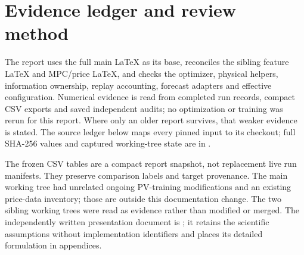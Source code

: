 \section{Evidence ledger and review method}
The report uses the full main LaTeX as its base, reconciles the sibling
feature LaTeX and MPC/price LaTeX, and checks the optimizer, physical helpers,
information ownership, replay accounting, forecast adapters and effective
configuration. Numerical evidence is read from completed run records, compact
CSV exports and saved independent audits; no optimization or training was
rerun for this report. Where only an older report survives, that weaker evidence
is stated. The source ledger below maps every pinned input to its checkout;
full SHA-256 values and captured working-tree state are in
.

The frozen CSV tables are a compact report snapshot, not replacement live run
manifests. They preserve comparison labels and target provenance. The main
working tree had unrelated ongoing PV-training modifications and an existing
price-data inventory; those are outside this documentation change. The two
sibling working trees were read as evidence rather than modified or merged.
The independently written presentation document is
; it retains the scientific assumptions without
implementation identifiers and places its detailed formulation in appendices.

